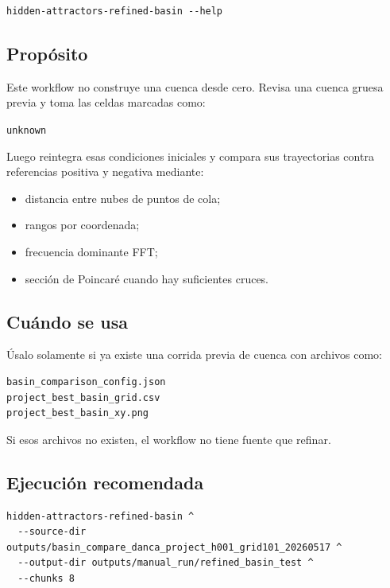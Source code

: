 \documentclass[11pt,letterpaper]{article}
\begin{document}
\begin{lstlisting}[style=terminal]
hidden-attractors-refined-basin --help
\end{lstlisting}

\subsection{Propósito}

Este workflow no construye una cuenca desde cero. Revisa una cuenca gruesa previa y toma las celdas marcadas como:

\begin{center}
\texttt{unknown}
\end{center}

Luego reintegra esas condiciones iniciales y compara sus trayectorias contra referencias positiva y negativa mediante:

\begin{itemize}
  \item distancia entre nubes de puntos de cola;
  \item rangos por coordenada;
  \item frecuencia dominante FFT;
  \item sección de Poincaré cuando hay suficientes cruces.
\end{itemize}

\subsection{Cuándo se usa}

Úsalo solamente si ya existe una corrida previa de cuenca con archivos como:

\begin{lstlisting}[style=terminal]
basin_comparison_config.json
project_best_basin_grid.csv
project_best_basin_xy.png
\end{lstlisting}

Si esos archivos no existen, el workflow no tiene fuente que refinar.

\subsection{Ejecución recomendada}

\begin{lstlisting}[style=terminal]
hidden-attractors-refined-basin ^
  --source-dir outputs/basin_compare_danca_project_h001_grid101_20260517 ^
  --output-dir outputs/manual_run/refined_basin_test ^
  --chunks 8
\end{lstlisting}
\end{document}
